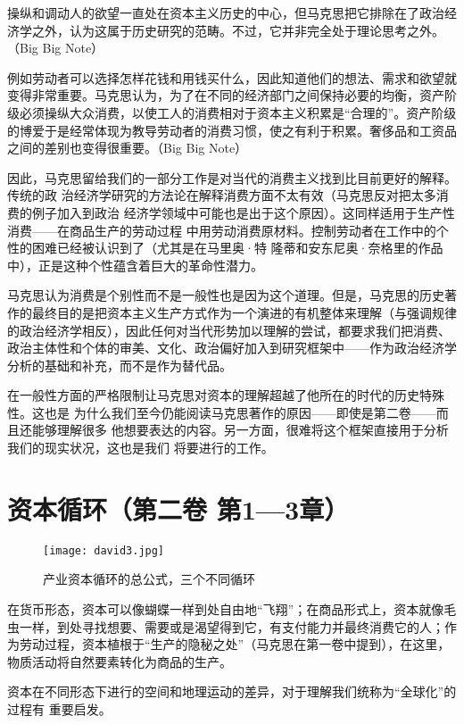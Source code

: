 操纵和调动人的欲望一直处在资本主义历史的中心，但马克思把它排除在了政治经济学之外，认为这属于历史研究的范畴。不过，它并非完全处于理论思考之外。（Big Big Note）


例如劳动者可以选择怎样花钱和用钱买什么，因此知道他们的想法、需求和欲望就变得非常重要。马克思认为，为了在不同的经济部门之间保持必要的均衡，资产阶级必须操纵大众消费，以使工人的消费相对于资本主义积累是“合理的”。资产阶级的博爱于是经常体现为教导劳动者的消费习惯，使之有利于积累。奢侈品和工资品之间的差别也变得很重要。（Big Big Note）

因此，马克思留给我们的一部分工作是对当代的消费主义找到比目前更好的解释。传统的政
治经济学研究的方法论在解释消费方面不太有效（马克思反对把太多消费的例子加入到政治
经济学领域中可能也是出于这个原因）。这同样适用于生产性消费——在商品生产的劳动过程
中用劳动消费原材料。控制劳动者在工作中的个性的困难已经被认识到了（尤其是在马里奥·特
隆蒂和安东尼奥·奈格里的作品中），正是这种个性蕴含着巨大的革命性潜力。

马克思认为消费是个别性而不是一般性也是因为这个道理。但是，马克思的历史著作的最终目的是把资本主义生产方式作为一个演进的有机整体来理解（与强调规律的政治经济学相反），因此任何对当代形势加以理解的尝试，都要求我们把消费、政治主体性和个体的审美、文化、政治偏好加入到研究框架中——作为政治经济学分析的基础和补充，而不是作为替代品。

在一般性方面的严格限制让马克思对资本的理解超越了他所在的时代的历史特殊性。这也是
为什么我们至今仍能阅读马克思著作的原因——即使是第二卷——而且还能够理解很多
他想要表达的内容。另一方面，很难将这个框架直接用于分析我们的现实状况，这也是我们
将要进行的工作。

\chapter{资本循环（第二卷 第1—3章）}

\begin{figure}
\centering
\texttt{[image: david3.jpg]}
\caption{产业资本循环的总公式，三个不同循环}
\end{figure}

在货币形态，资本可以像蝴蝶一样到处自由地“飞翔”；在商品形式上，资本就像毛虫一样，到处寻找想要、需要或是渴望得到它，有支付能力并最终消费它的人；作为劳动过程，资本植根于“生产的隐秘之处”（马克思在第一卷中提到），在这里，物质活动将自然要素转化为商品的生产。

资本在不同形态下进行的空间和地理运动的差异，对于理解我们统称为“全球化”的过程有
重要启发。

